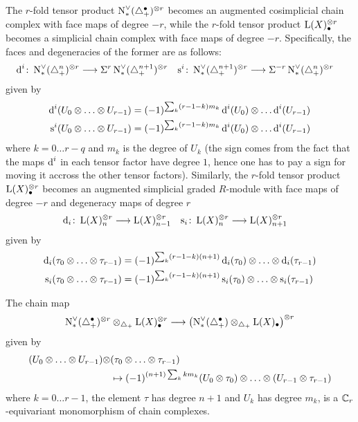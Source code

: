 The $r$-fold tensor product $\operatorname{N}^\vee_{*}(\triangle_{+}^\bullet)^{\otimes r}$ becomes an augmented cosimplicial chain complex with face maps of degree $-r$, while the $r$-fold tensor product $\operatorname{L}(X)_\bullet^{\otimes r}$ becomes a simplicial chain complex with face maps of degree $-r$. Specifically, the faces and degeneracies of the former are as follows:
\begin{align*}
	\operatorname{d}^i \colon \operatorname{N}^\vee_{*}(\triangle_{+}^n)^{\otimes r}& \longrightarrow \Sigma^{r}\operatorname{N}^\vee_{*}(\triangle_{+}^{n+1})^{\otimes r}
	&
	\operatorname{s}^i \colon \operatorname{N}^\vee_{*}(\triangle_{+}^{n+1})^{\otimes r}& \longrightarrow \Sigma^{-r}\operatorname{N}^\vee_{*}(\triangle_{+}^{n})^{\otimes r}
\end{align*}
given by
\begin{align*}
	\d^i(U_0 \ot \dots \ot U_{r-1}) &= (-1)^{\sum_k (r-1-k)m_k}\d^i(U_0) \ot \dots \d^i(U_{r-1})
	\\
	\s^i(U_0 \ot \dots \ot U_{r-1}) &= (-1)^{\sum_k (r-1-k)m_k}\d^i(U_0) \ot \dots \d^i(U_{r-1})
\end{align*}
where $k = 0\dots r-q$ and $m_k$ is the degree of $U_k$ (the sign comes from the fact that the maps $\operatorname{d}^i$ in each tensor factor have degree $1$, hence one has to pay a sign for moving it accross the other tensor factors). Similarly, the $r$-fold tensor product $\operatorname{L}(X)^{\otimes r}_{\bullet}$ becomes an augmented simplicial graded $R$-module with face maps of degree $-r$ and degeneracy maps of degree $r$
\begin{align*}
	\operatorname{d}_i \colon \operatorname{L}(X)_n^{\otimes r} & \longrightarrow \operatorname{L}(X)_{n-1}^{\otimes r}
	&
	\operatorname{s}_i \colon \operatorname{L}(X)_n^{\otimes r} & \longrightarrow \operatorname{L}(X)_{n+1}^{\otimes r}
\end{align*}
given by
\begin{align*}
	\d_i(\tau_0 \ot \dots \ot \tau_{r-1}) &= (-1)^{\sum_k (r-1-k)(n+1)} \d_i(\tau_0) \ot \dots \ot \d_i(\tau_{r-1})
\\
	\s_i(\tau_0 \ot \dots \ot \tau_{r-1}) &= (-1)^{\sum_k (r-1-k)(n+1)} \s_i(\tau_0) \ot \dots \ot \s_i(\tau_{r-1})
	\end{align*}
\begin{lemma}\label{lemma:3}
	The chain map
	\[\operatorname{N}^\vee_{*}(\triangle_{+}^\bullet)^{\otimes r} \otimes_{\triangle_{+}} \operatorname{L}(X)_\bullet^{\otimes r} \longrightarrow \left(\operatorname{N}^\vee_{*}(\triangle_{+}^\bullet) \otimes_{\triangle_{+}} \operatorname{L}(X)_\bullet\right)^{\otimes r}\]
	given by
	\begin{align*}
		(U_0 \ot \dots \ot U_{r-1}) \ot &(\tau_0 \ot \dots \ot \tau_{r-1})
	\\
 &\mapsto (-1)^{(n+1)\sum_{k} km_k}(U_0 \ot \tau_0) \ot \dots \ot (U_{r-1} \ot \tau_{r-1})
	\end{align*}
where $k=0\dots r-1$, the element $\tau$ has degree $n+1$ and $U_k$ has degree $m_k$, is a $\mathbb{C}_r$-equivariant monomorphism of chain complexes.
\end{lemma}
